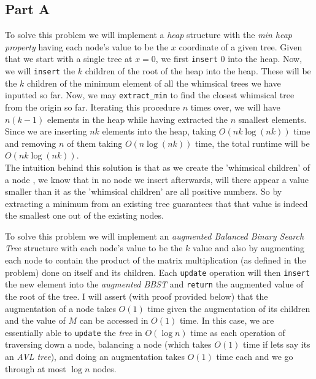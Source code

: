 \documentclass[12pt,twoside]{article}
\begin{document}

\begin{problems}

\section*{Part A}

\problem  %

To solve this problem we will implement a \emph{heap} structure with the \emph{min heap property} having each node's value to be the $x$ coordinate of a given tree. Given that we start with a single tree at $x = 0$, we first {\tt insert} $0$ into the heap. Now, we will {\tt insert} the $k$ children of the root of the heap into the heap. These will be the $k$ children of the minimum element of all the whimsical trees we have inputted so far. Now, we may {\tt extract\_min} to find the closest whimsical tree from the origin so far. Iterating this procedure $n$ times over, we will have $n(k-1)$ elements in the heap while having extracted the $n$ smallest elements. Since we are inserting $nk$ elements into the heap, taking $O(nk \log(nk))$ time and removing $n$ of them taking $O(n \log(nk))$ time, the total runtime will be $O(nk \log(nk))$.\\

The intuition behind this solution is that as we create the 'whimsical children' of a node , we know that in no node we insert afterwards, will there appear a value smaller than it as the 'whimsical children' are all positive numbers. So by extracting a minimum from an existing tree guarantees that that value is indeed the smallest one out of the existing nodes.

\problem  %

To solve this problem we will implement an \emph{augmented Balanced Binary Search Tree} structure with each node's value to be the $k$ value and also by augmenting each node to contain the product of the matrix multiplication (as defined in the problem) done on itself and its children. Each {\tt update} operation will then {\tt insert} the new element into the \emph{augmented BBST} and {\tt return} the augmented value of the root of the tree. I will assert (with proof provided below) that the augmentation of a node takes $O(1)$ time given the augmentation of its children and the value of $M$ can be accessed in $O(1)$ time. In this case, we are essentially able to {\tt update} the \emph{tree} in $O(\log n)$ time as each operation of traversing down a node, balancing a node (which takes $O(1)$ time if lets say its an \emph{AVL tree}), and doing an augmentation takes $O(1)$ time each and we go through at most $\log n$ nodes.\\


\end{problems}
\end{document}
